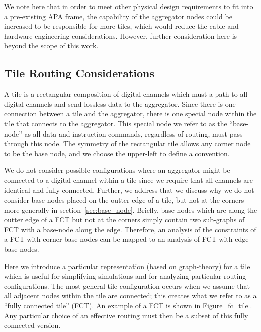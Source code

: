 We note here that in order to meet other physical design requirements to fit into a pre-existing APA frame, the capability of the aggregator nodes could be increased to be responsible for more tiles, which would reduce the cable and hardware engineering considerations.
However, further consideration here is beyond the scope of this work.


\subsection{Tile Routing Considerations}

A tile is a rectangular composition of digital channels which must a path to all digital channels and send lossless data to the aggregator.
Since there is one connection between a tile and the aggregator, there is one special node within the tile that connects to the aggregator.
This special node we refer to as the ``base-node'' as all data and instruction commands, regardless of routing, must pass through this node.
The symmetry of the rectangular tile allows any corner node to be the base node, and we choose the upper-left to define a convention.

We do not consider possible configurations where an aggregator might be connected to a digital channel within a tile since we require that all channels are identical and fully connected.
Further, we address that we discuss why we do not consider base-nodes placed on the outter edge of a tile, but not at the corners more generally in section~\ref{sec:base_node}.
Briefly, base-nodes which are along the outter edge of a FCT but not at the corners simply contain two sub-graphs of FCT with a base-node along the edge.
Therefore, an analysis of the constraints of a FCT with corner base-nodes can be mapped to an analysis of FCT with edge base-nodes.

Here we introduce a particular representation (based on graph-theory) for a tile which is useful for simplifying simulations and for analyzing particular routing configurations.
The most general tile configuration occurs when we assume that all adjacent nodes within the tile are connected; this creates what we refer to as a ``fully connected tile'' (FCT).
An example of a FCT is shown in Figure~\ref{fc_tile}.
Any particular choice of an effective routing must then be a subset of this fully connected version.

